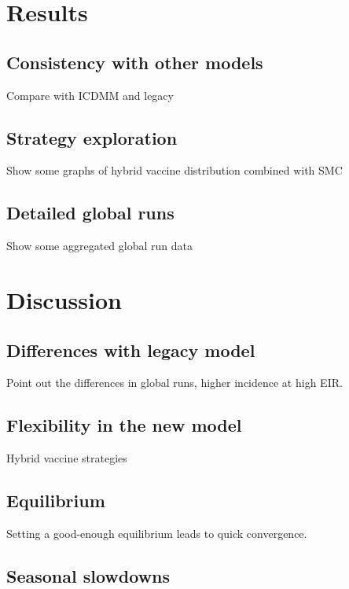 \documentclass{bmcart}
\begin{document}
\section*{Results}

\subsection*{Consistency with other models}

Compare with ICDMM and legacy

\subsection*{Strategy exploration}

Show some graphs of hybrid vaccine distribution combined with SMC

\subsection*{Detailed global runs}

Show some aggregated global run data

\section*{Discussion}

\subsection*{Differences with legacy model}

Point out the differences in global runs, higher incidence at high EIR.

\subsection*{Flexibility in the new model}

Hybrid vaccine strategies

\subsection*{Equilibrium}

Setting a good-enough equilibrium leads to quick convergence.

\subsection*{Seasonal slowdowns}
\end{document}
